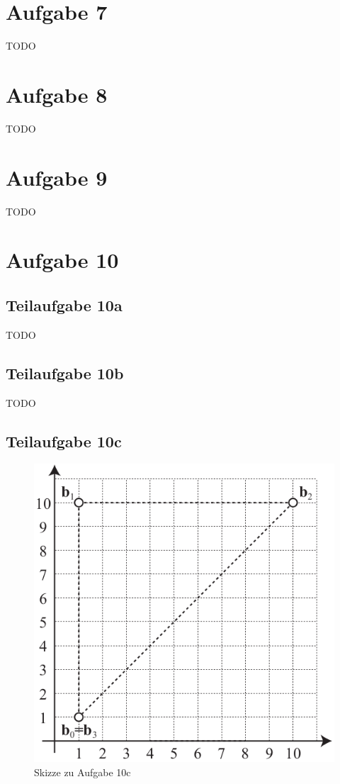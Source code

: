 \documentclass[a4paper]{scrartcl}
\begin{document}
\section*{Aufgabe 7}
TODO

\section*{Aufgabe 8}
TODO

\section*{Aufgabe 9}
TODO

\section*{Aufgabe 10}
\subsection*{Teilaufgabe 10a}
TODO

\subsection*{Teilaufgabe 10b}
TODO

\subsection*{Teilaufgabe 10c}
\begin{figure}[h]
    \centering
    \includegraphics*[width=0.8\linewidth, keepaspectratio]{10c.png}
    \caption{Skizze zu Aufgabe 10c}
    \label{fig:10c}
\end{figure}
\end{document}

